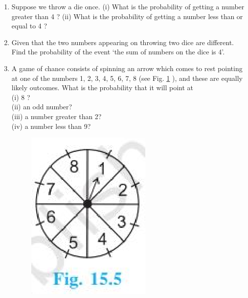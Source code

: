 \begin{enumerate}[label=\thesection.\arabic*.,ref=\thesection.\theenumi]
\item Suppose we throw a die once. (i) What is the probability of getting a number greater than 4 ? (ii) What is the probability of getting a number less than or
equal to 4 ?
\\
\solution

\item  Given that the two numbers appearing on throwing two dice are different. Find the probability of the event `the sum of numbers on the dice is 4'.\\
\solution

\item A game of chance consists of spinning an arrow which comes to rest pointing at one of the numbers 1, 2, 3, 4, 5, 6, 7, 8 (see Fig. \ref{fig:122} ), and these are equally likely outcomes. What is the probability that it will point at\\
(i) 8 ?\\
(ii) an odd number?\\
(iii) a number greater than 2?\\
(iv) a number less than 9?\\
\begin{figure}[!ht]
\centering
\includegraphics[width=\columnwidth]{./prob/figs/clock.eps}
\caption{}
\label{fig:122}
\end{figure}
\\
\solution



\end{enumerate}
